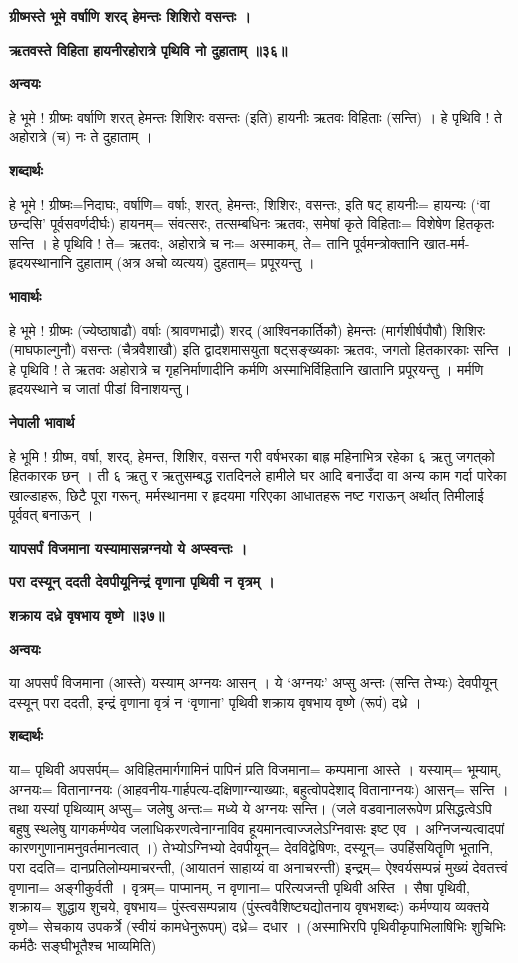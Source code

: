 \documentclass[11pt, a5paper]{article}
\begin{document}
\textbf{ग्रीष्मस्ते भूमे वर्षाणि शरद् हेमन्तः शिशिरो वसन्तः ।}

\textbf{ऋतवस्ते विहिता हायनीरहोरात्रे पृथिवि नो दुहाताम् ॥३६॥}

\textbf{अन्वयः}

हे भूमे ! ग्रीष्मः वर्षाणि शरत् हेमन्तः शिशिरः वसन्तः (इति) हायनीः ऋतवः विहिताः (सन्ति) । हे पृथिवि ! ते अहोरात्रे (च) नः ते दुहाताम् ।

\textbf{शब्दार्थः}

हे भूमे ! ग्रीष्मः=निदाघः, वर्षाणि= वर्षाः, शरत्, हेमन्तः, शिशिरः, वसन्तः, इति षट् हायनीः= हायन्यः (‘वा छन्दसि’ पूर्वसवर्णदीर्घः) हायनम्= संवत्सरः, तत्सम्बधिनः ऋतवः, समेषां कृते विहिताः= विशेषेण हितकृतः सन्ति । हे पृथिवि ! ते= ऋतवः, अहोरात्रे च नः= अस्माकम्, ते= तानि पूर्वमन्त्रोक्तानि खात-मर्म-हृदयस्थानानि दुहाताम् (अत्र अचो व्यत्यय) दुहताम्= प्रपूरयन्तु ।

\textbf{भावार्थः}

हे भूमे ! ग्रीष्मः (ज्येष्ठाषाढौ) वर्षाः (श्रावणभाद्रौ) शरद् (आश्विनकार्तिकौ) हेमन्तः (मार्गशीर्षपौषौ) शिशिरः (माघफाल्गुनौ) वसन्तः (चैत्रवैशाखौ) इति द्वादशमासयुता षट्‍सङ्‍ख्यकाः ऋतवः, जगतो हितकारकाः सन्ति । हे पृथिवि ! ते ऋतवः अहोरात्रे च गृहनिर्माणादीनि कर्मणि अस्माभिर्विहितानि खातानि प्रपूरयन्तु । मर्मणि हृदयस्थाने च जातां पीडां विनाशयन्तु।

\textbf{नेपाली भावार्थ}

हे भूमि  ! ग्रीष्म, वर्षा, शरद्, हेमन्त, शिशिर, वसन्त गरी वर्षभरका बाह्र महिनाभित्र रहेका ६ ऋतु जगत्‌को हितकारक छन् । ती ६ ऋतु र ऋतुसम्बद्ध रातदिनले हामीले घर आदि बनाउँदा वा अन्य काम गर्दा पारेका खाल्डाहरू, छिटै पूरा गरून्, मर्मस्थानमा र हृदयमा गरिएका आधातहरू नष्ट गराऊन् अर्थात् तिमीलाई पूर्ववत् बनाऊन् ।

\textbf{यापसर्पं विजमाना यस्यामासन्नग्नयो ये अप्स्वन्तः ।}

\textbf{परा दस्यून् ददती देवपीयूनिन्द्रं वृणाना पृथिवी न वृत्रम् ।}

\textbf{शक्राय दध्रे वृषभाय वृष्णे ॥३७॥}

\textbf{अन्वयः}

या अपसर्पं विजमाना (आस्ते) यस्याम् अग्नयः आसन् । ये ‘अग्नयः’ अप्सु अन्तः (सन्ति तेभ्यः) देवपीयून् दस्यून् परा ददती, इन्द्रं वृणाना वृत्रं न ‘वृणाना’ पृथिवी शक्राय वृषभाय वृष्णे (रूपं) दध्रे ।

\textbf{शब्दार्थः}

या= पृथिवी अपसर्पम्= अविहितमार्गगामिनं पापिनं प्रति विजमाना= कम्पमाना आस्ते । यस्याम्= भूम्याम्, अग्नयः= वितानाग्नयः (आहवनीय-गार्हपत्य-दक्षिणाग्न्याख्याः, बहुत्वोपदेशाद् वितानाग्नयः) आसन्= सन्ति । तथा यस्यां पृथिव्याम् अप्सु= जलेषु अन्तः= मध्ये ये अग्नयः सन्ति। (जले वडवानालरूपेण प्रसिद्धत्वेऽपि बहुषु स्थलेषु यागकर्मण्येव जलाधिकरणत्वेनाग्नाविव हूयमानत्वाज्जलेऽग्निवासः इष्ट एव । अग्निजन्यत्वादपां कारणगुणानामनुवर्तमानत्वात् ।) तेभ्योऽग्निभ्यो देवपीयून्= देवविद्वेषिणः, दस्यून्= उपहिंसयितॄणि भूतानि, परा ददति= दानप्रतिलोम्यमाचरन्ती, (आयातनं साहाय्यं वा अनाचरन्ती) इन्द्रम्= ऐश्वर्यसम्पन्नं मुख्यं देवतत्त्वं वृणाना= अङ्गीकुर्वती । वृत्रम्= पाप्मानम्, न वृणाना= परित्यजन्ती पृथिवी अस्ति । सैषा पृथिवी, शक्राय= शुद्धाय शुचये, वृषभाय= पुंस्त्वसम्पन्नाय (पुंस्त्ववैशिष्ट्यद्योतनाय वृषभशब्दः) कर्मण्याय व्यक्तये वृष्णे= सेचकाय उपकर्त्रे (स्वीयं कामधेनुरूपम्) दध्रे‍‍‍= दधार । (अस्माभिरपि पृथिवीकृपाभिलाषिभिः शुचिभिः कर्मठैः सङ्‌घीभूतैश्च भाव्यमिति)
\end{document}

